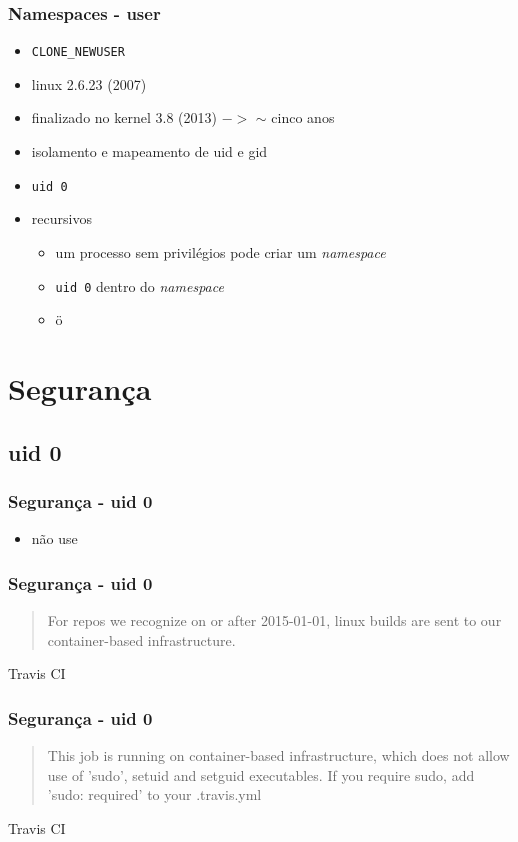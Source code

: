 \documentclass{beamer}
\begin{document}
\begin{frame}
    \frametitle{Namespaces - user}
    \begin{itemize}
        \item \texttt{CLONE\_NEWUSER}
        \item linux 2.6.23 (2007)
        \item finalizado no kernel 3.8 (2013) $->$ $\sim$ cinco anos
        \item isolamento e mapeamento de uid e gid
        \item \texttt{uid 0}
        \item recursivos
        \begin{itemize}
            \item um processo sem privilégios pode criar um \textit{namespace}
            \item \texttt{uid 0} dentro do \textit{namespace}
            \item ö
        \end{itemize}
    \end{itemize}
\end{frame}

\section{Segurança}

\subsection{uid 0}

\begin{frame}
    \frametitle{Segurança - uid 0}
    \begin{itemize}
        \item não use
    \end{itemize}
\end{frame}

\begin{frame}
    \frametitle{Segurança - uid 0}
    \begin{quote}
        For repos we recognize on or after 2015-01-01, linux builds are sent to
        our container-based infrastructure.
    \end{quote}
    Travis CI
\end{frame}

\begin{frame}
    \frametitle{Segurança - uid 0}
    \begin{quote}
        This job is running on container-based infrastructure, which does not
        allow use of 'sudo', setuid and setguid executables.  If you require
        sudo, add 'sudo: required' to your .travis.yml
    \end{quote}
    Travis CI
\end{frame}
\end{document}
